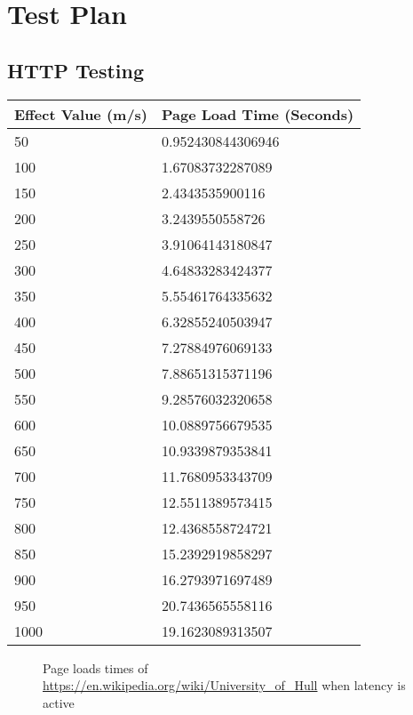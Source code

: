 \begin{appendices}

%
\chapter{Test Plan}
\label{ref:testplan}


\begin{center}
\chapter{HTTP Testing}
\label{ref:httpTesting}
\end{center}


\begin{tabular}{| l | l |}
	\hline
	{\bf Effect Value (m/s)} & {\bf Page Load Time (Seconds)} \\\hline
	50					& 0.952430844306946	 \\\hline
    100					& 1.67083732287089 \\\hline
	150 				& 2.4343535900116 \\\hline
	200					& 3.2439550558726 \\\hline
	250					& 3.91064143180847\\\hline
	300 				& 4.64833283424377\\\hline
	350					& 5.55461764335632\\\hline
	400					& 6.32855240503947\\\hline
	450					& 7.27884976069133\\\hline
	500					& 7.88651315371196\\\hline
	550					& 9.28576032320658\\\hline
	600					& 10.0889756679535\\\hline
	650					& 10.9339879353841\\\hline
	700					& 11.7680953343709\\\hline
	750					& 12.5511389573415\\\hline
	800					& 12.4368558724721\\\hline
	850					& 15.2392919858297\\\hline
	900 				& 16.2793971697489\\\hline
	950					& 20.7436565558116\\\hline
	1000				& 19.1623089313507\\\hline
\end{tabular}
\begin{figure}[h]
	\caption{Page loads times of \url{https://en.wikipedia.org/wiki/University_of_Hull} when latency is active}
	\label{ref:latencyHttp}
\end{figure}


\end{appendices}
